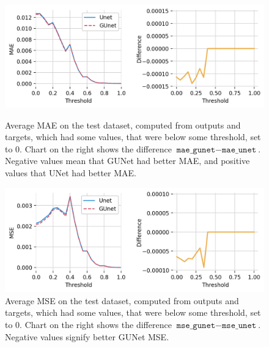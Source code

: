 \begin{figure}[ht]
    \centering
    \begin{subcaptionblock}[t]{\textwidth}
        \centering
        \includegraphics[width=\textwidth]{images/threshold_mae.png}
        \caption[Higher intensity storm prediction metrics]{\label{fig:threshold_mae}Average \gls{MAE} on the test dataset, computed from outputs and targets, which had some values, that were below some threshold, set to 0. Chart on the right shows the difference $\texttt{mae\_gunet} - \texttt{mae\_unet}$. Negative values mean that GUNet had better \gls{MAE}, and positive values that UNet had better \gls{MAE}.}
    \end{subcaptionblock}
    \begin{subcaptionblock}[t]{\textwidth}
        \centering
        \includegraphics[width=\textwidth]{images/threshold_mse.png}
        \caption[Higher intensity storm prediction metrics]{\label{fig:threshold_mse}Average \gls{MSE} on the test dataset, computed from outputs and targets, which had some values, that were below some threshold, set to 0. Chart on the right shows the difference $\texttt{mse\_gunet} - \texttt{mse\_unet}$. Negative values signify better GUNet \gls{MSE}.}
    \end{subcaptionblock}
\end{figure}


